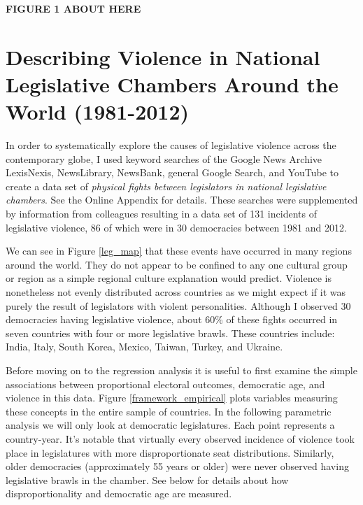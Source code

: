 \documentclass[a4paper]{article}\usepackage[]{graphicx}\usepackage[]{color}
\begin{document}
\vspace{0.5cm}

\textbf{FIGURE 1 ABOUT HERE}

\vspace{0.5cm}

\section*{Describing Violence in National Legislative Chambers Around the World (1981-2012)}

In order to systematically explore the causes of legislative violence across the contemporary globe, I used keyword searches of the Google News Archive LexisNexis, NewsLibrary, NewsBank, general Google Search, and YouTube to create a data set of {\emph{physical fights between legislators in national legislative chambers}}. See the Online Appendix for details. These searches were supplemented by information from colleagues resulting in a data set of 131 incidents of legislative violence, 86 of which were in 30 democracies between 1981 and 2012.

We can see in Figure \ref{leg_map} that these events have occurred in many regions around the world. They do not appear to be confined to any one cultural group or region as a simple regional culture explanation would predict. Violence is nonetheless not evenly distributed across countries as we might expect if it was purely the result of legislators with violent personalities. Although I observed 30 democracies having legislative violence, about 60\% of these fights occurred in seven countries with four or more legislative brawls. These countries include: India, Italy, South Korea, Mexico, Taiwan, Turkey, and Ukraine.

Before moving on to the regression analysis it is useful to first examine the simple associations between proportional electoral outcomes, democratic age, and violence in this data. Figure \ref{framework_empirical} plots variables measuring these concepts in the entire sample of countries. In the following parametric analysis we will only look at democratic legislatures. Each point represents a country-year. It's notable that virtually every observed incidence of violence took place in legislatures with more disproportionate seat distributions. Similarly, older democracies (approximately 55 years or older) were never observed having legislative brawls in the chamber. See below for details about how disproportionality and democratic age are measured.
\end{document}
